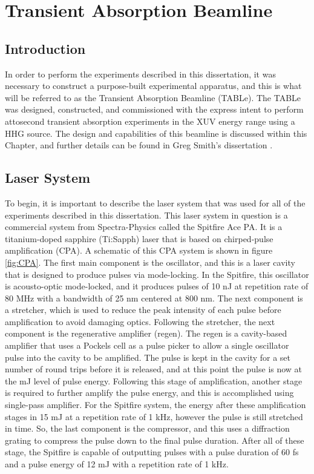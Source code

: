 \chapter{Transient Absorption Beamline}
\label{beamline}

\section{Introduction}
\label{intro_beamline}
In order to perform the experiments described in this dissertation, it was necessary to construct a purpose-built experimental apparatus, and this is what will be referred to as the Transient Absorption Beamline (TABLe).  The TABLe was designed, constructed, and commissioned with the express intent to perform attosecond transient absorption experiments in the XUV energy range using a HHG source.  The design and capabilities of this beamline is discussed within this Chapter, and further details can be found in Greg Smith's dissertation \cite{smithApplicationAttosecondTechniques2020}.

\section{Laser System}
\label{sec:laser_system}
To begin, it is important to describe the laser system that was used for all of the experiments described in this dissertation.  This laser system in question is a commercial system from Spectra-Physics called the Spitfire Ace PA.  It is a titanium-doped sapphire (Ti:Sapph) laser that is based on chirped-pulse amplification (CPA).  A schematic of this CPA system is shown in figure \ref{fig:CPA}.  The first main component is the oscillator, and this is a laser cavity that is designed to produce pulses via mode-locking.  In the Spitfire, this oscillator is acousto-optic mode-locked, and it produces pulses of 10 nJ at repetition rate of 80 MHz with a bandwidth of 25 nm centered at 800 nm.  The next component is a stretcher, which is used to reduce the peak intensity of each pulse before amplification to avoid damaging optics.  Following the stretcher, the next component is the regenerative amplifier (regen).  The regen is a cavity-based amplifier that uses a Pockels cell as a pulse picker to allow a single oscillator pulse into the cavity to be amplified.  The pulse is kept in the cavity for a set number of round trips before it is released, and at this point the pulse is now at the mJ level of pulse energy.  Following this stage of amplification, another stage is required to further amplify the pulse energy, and this is accomplished using single-pass amplifier.  For the Spitfire system, the energy after these amplification stages in 15 mJ at a repetition rate of 1 kHz, however the pulse is still stretched in time.  So, the last component is the compressor, and this uses a diffraction grating to compress the pulse down to the final pulse duration.  After all of these stage, the Spitfire is capable of outputting pulses with a pulse duration of 60 fs and a pulse energy of 12 mJ with a repetition rate of 1 kHz.

